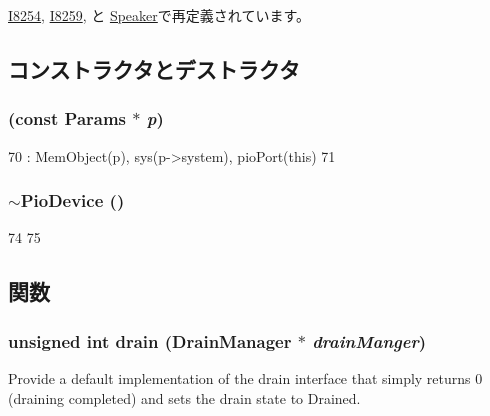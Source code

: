 \hyperlink{classX86ISA_1_1I8254_aed9bbf7fa13cb3e5f1c7805d04bffb78}{I8254}, \hyperlink{classX86ISA_1_1I8259_a370f3ee3a425cd3262c46d09b80327fe}{I8259}, と \hyperlink{classX86ISA_1_1Speaker_ae21f9523ca3e32b9fd40e1e647ebd365}{Speaker}で再定義されています。

\subsection{コンストラクタとデストラクタ}
\hypertarget{classPioDevice_a0070809b25a5a5f3b3195a0fe94a2121}{
\subsubsection[{PioDevice}]{ (const {\bf Params} $\ast$ {\em p})}}
\label{classPioDevice_a0070809b25a5a5f3b3195a0fe94a2121}



\begin{DoxyCode}
70     : MemObject(p), sys(p->system), pioPort(this)
71 {}
\end{DoxyCode}
\hypertarget{classPioDevice_a70ec6cbb62f7ecf57b0c662c7618c7e6}{
\subsubsection[{$\sim$PioDevice}]{\setlength{\rightskip}{0pt plus 5cm}$\sim${\bf PioDevice} ()}}
\label{classPioDevice_a70ec6cbb62f7ecf57b0c662c7618c7e6}



\begin{DoxyCode}
74 {
75 }
\end{DoxyCode}


\subsection{関数}
\hypertarget{classPioDevice_a6bf479c521c7c3eb473822d953275b26}{
\subsubsection[{drain}]{\setlength{\rightskip}{0pt plus 5cm}unsigned int drain ({\bf DrainManager} $\ast$ {\em drainManger})}}
\label{classPioDevice_a6bf479c521c7c3eb473822d953275b26}
Provide a default implementation of the drain interface that simply returns 0 (draining completed) and sets the drain state to Drained. 

